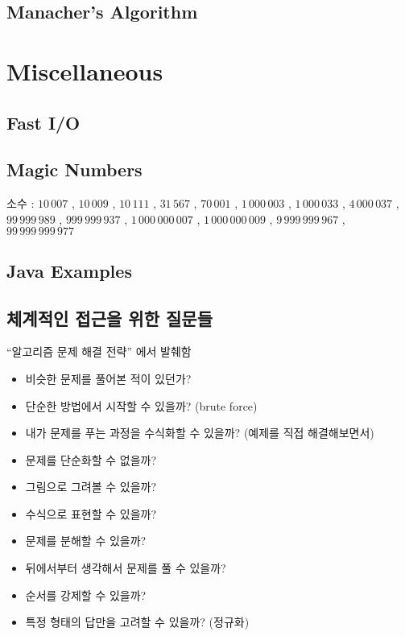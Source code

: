 \documentclass[10pt,landscape,a4paper,twocolumn]{article}
\begin{document}
\subsection{Manacher's Algorithm}



\section{Miscellaneous}

\subsection{Fast I/O}


\subsection{Magic Numbers}

소수 : $10\,007$ , $10\,009$ , $10\,111$ , $31\,567$ , $70\,001$ , $1\,000\,003$ , $1\,000\,033$ , $4\,000\,037$ , $99\,999\,989$ , $999\,999\,937$ , $1\,000\,000\,007$ , $1\,000\,000\,009$ , $9\,999\,999\,967$ , $99\,999\,999\,977$



\subsection{Java Examples}



\subsection{체계적인 접근을 위한 질문들}

``알고리즘 문제 해결 전략'' 에서 발췌함
\begin{itemize}
\item 비슷한 문제를 풀어본 적이 있던가?
\item 단순한 방법에서 시작할 수 있을까? (brute force)
\item 내가 문제를 푸는 과정을 수식화할 수 있을까? (예제를 직접 해결해보면서)
\item 문제를 단순화할 수 없을까?
\item 그림으로 그려볼 수 있을까?
\item 수식으로 표현할 수 있을까?
\item 문제를 분해할 수 있을까?
\item 뒤에서부터 생각해서 문제를 풀 수 있을까?
\item 순서를 강제할 수 있을까?
\item 특정 형태의 답만을 고려할 수 있을까? (정규화)
\end{itemize}
\end{document}
